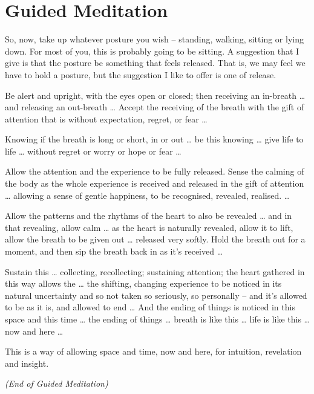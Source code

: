 \section{Guided Meditation}

So, now, take up whatever posture you wish -- standing, walking, sitting or
lying down. For most of you, this is probably going to be sitting. A suggestion
that I give is that the posture be something that feels released. That is, we
may feel we have to hold a posture, but the suggestion I like to offer is one of
release.

Be alert and upright, with the eyes open or closed; then receiving an in-breath
\ldots{} and releasing an out-breath \ldots{} Accept the receiving of the breath
with the gift of attention that is without expectation, regret, or fear \ldots{}

Knowing if the breath is long or short, in or out \ldots{} be this knowing
\ldots{} give life to life \ldots{} without regret or worry or hope or fear
\ldots{}

Allow the attention and the experience to be fully released. Sense the calming
of the body as the whole experience is received and released in the gift of
attention \ldots{} allowing a sense of gentle happiness, to be recognised,
revealed, realised. \ldots{}

Allow the patterns and the rhythms of the heart to also be revealed \ldots{} and
in that revealing, allow calm \ldots{} as the heart is naturally revealed, allow it to lift,
allow the breath to be given out \ldots{} released very softly. Hold the breath
out for a moment, and then sip the breath back in as it's received \ldots{}

Sustain this \ldots{} collecting, recollecting; sustaining attention; the heart gathered in this way allows the
\ldots{} the shifting, changing experience to be noticed in its natural uncertainty and so not taken so seriously, so personally -- and it's allowed to be as it is, and allowed
to end \ldots{} And the ending of things is noticed in this space and this time
\ldots{} the ending of things \ldots{} breath is like this \ldots{} life is like
this \ldots{} now and here \ldots{}

This is a way of allowing space and time, now and here, for intuition,
revelation and insight.

\bigskip

{\centering
\textit{(End of Guided Meditation)}
\par}

\bigskip

